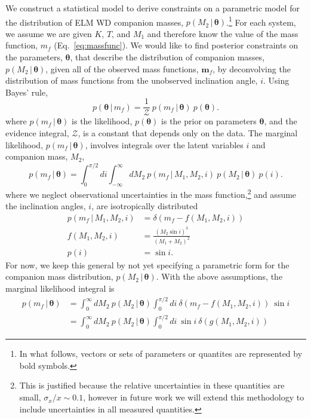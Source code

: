 \documentclass[letterpaper,12pt,preprint]{aastex}
\newcommand{\given}{\,|\,}
\newcommand{\bs}[1]{\boldsymbol{#1}}
\begin{document}
We construct a statistical model to derive constraints on a parametric model for the distribution of ELM WD companion masses, $p(M_2 \given \bs{\theta})$.\footnote{In what follows, vectors or sets of parameters or quantites are represented by bold symbols.} For each system, we assume we are given $K$, $T$, and $M_1$ and therefore know the value of the mass function, $m_f$ (Eq.~\ref{eq:massfunc}). We would like to find posterior constraints on the parameters, $\bs{\theta}$, that describe the distribution of companion masses, $p(M_2\given \bs{\theta})$, given all of the observed mass functions, $\bs{m}_f$, by deconvolving the distribution of mass functions from the unobserved inclination angle, $i$. Using Bayes' rule,
\begin{equation}
    p(\bs{\theta} \given m_f) = \frac{1}{\mathcal{Z}}~p(m_f \given \bs{\theta})~p(\bs{\theta}).
\end{equation}
where $p(m_f \given \bs{\theta})$ is the likelihood, $p(\bs{\theta})$ is the prior on parameters $\bs{\theta}$, and the evidence integral, $\mathcal{Z}$, is a constant that depends only on the data. The marginal likelihood, $p(m_f \given \bs{\theta})$, involves integrals over the latent variables $i$ and companion mass, $M_2$,
\begin{equation}
    p(m_f \given \bs{\theta}) = \int_0^{\pi/2} di \int_{-\infty}^\infty dM_2~p(m_f \given M_1, M_2, i)~p(M_2 \given \bs{\theta})~p(i).
\end{equation}
where we neglect observational uncertainties in the mass function,\footnote{This is justified because the relative uncertainties in these quantities are small, $\sigma_x / x \sim 0.1$, however in future work we will extend this methodology to include uncertainties in all measured quantities.} and assume the inclination angles, $i$, are isotropically distributed
\begin{align}
	p(m_f \given M_1, M_2, i) &= \delta(m_f - f(M_1, M_2, i))\\
	f(M_1, M_2, i) &= \frac{(M_2 \sin i)^3}{(M_1 + M_2)^2}\\
	p(i) &= \sin i.
\end{align}
For now, we keep this general by not yet specifying a parametric form for the companion mass distribution, $p(M_2 \given \bs{\theta})$. With the above assumptions, the marginal likelihood integral is
\begin{align}
    p(m_f \given \bs{\theta}) &= \int_{0}^\infty dM_2~p(M_2 \given \bs{\theta}) \int_0^{\pi/2} di ~ \delta(m_f - f(M_1, M_2, i))~\sin i\\
    &= \int_{0}^\infty dM_2~p(M_2 \given \bs{\theta}) \int_0^{\pi/2} di ~\sin i ~ \delta(g(M_1,M_2,i))\label{eq:delta}
\end{align}
\end{document}
